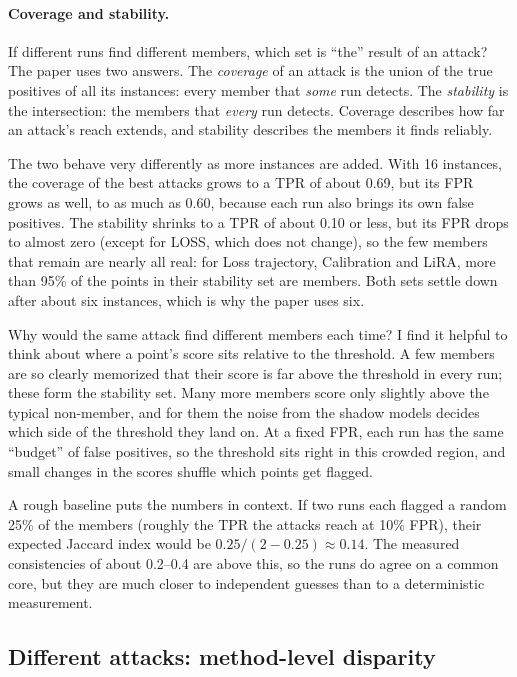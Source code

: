 \documentclass[a4paper]{article}
\begin{document}
\paragraph{Coverage and stability.}
If different runs find different members, which set is ``the'' result of an attack?
The paper uses two answers.
The \emph{coverage} of an attack is the union of the true positives of all its instances: every member that \emph{some} run detects.
The \emph{stability} is the intersection: the members that \emph{every} run detects.
Coverage describes how far an attack's reach extends, and stability describes the members it finds reliably.

The two behave very differently as more instances are added.
With 16 instances, the coverage of the best attacks grows to a TPR of about 0.69, but its FPR grows as well, to as much as 0.60, because each run also brings its own false positives.
The stability shrinks to a TPR of about 0.10 or less, but its FPR drops to almost zero (except for LOSS, which does not change), so the few members that remain are nearly all real: for Loss trajectory, Calibration and LiRA, more than 95\% of the points in their stability set are members.
Both sets settle down after about six instances, which is why the paper uses six.

\begin{ownview}
Why would the same attack find different members each time? I find it helpful to think about where a point's score sits relative to the threshold.
A few members are so clearly memorized that their score is far above the threshold in every run; these form the stability set.
Many more members score only slightly above the typical non-member, and for them the noise from the shadow models decides which side of the threshold they land on. At a fixed FPR, each run has the same ``budget'' of false positives, so the threshold sits right in this crowded region, and small changes in the scores shuffle which points get flagged.

A rough baseline puts the numbers in context. If two runs each flagged a random 25\% of the members (roughly the TPR the attacks reach at 10\% FPR), their expected Jaccard index would be $0.25/(2-0.25) \approx 0.14$. The measured consistencies of about 0.2--0.4 are above this, so the runs do agree on a common core, but they are much closer to independent guesses than to a deterministic measurement.
\end{ownview}

\subsection{Different attacks: method-level disparity}
\label{subsec:method-disparity}
\end{document}
